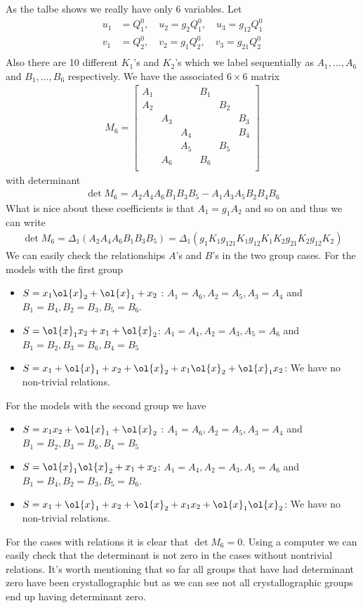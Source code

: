As the talbe shows we really have only 6 variables. Let
\begin{align}
	u_1 &= Q_1^0,\quad u_2 = g_2 Q_1^0,\quad u_3 = g_{12}Q_1^0\\
	v_1 &= Q_2^0,\quad v_2 = g_1 Q_2^0,\quad v_3 = g_{21}Q_2^0\\
\end{align}
Also there are 10 different $K_1$'s and $K_2$'s which we label sequentially as $A_1,\ldots,A_6$ and $B_1,\ldots,B_6$ respectively. We have the associated $ 6 \times 6$ matrix
\begin{align}
	M_6 = \begin{bmatrix}
	A_1& & & B_1 & & \\
	A_2& & & & B_2& \\
	& A_3& & & & B_3\\
	& & A_4 & & & B_4\\
	& & A_5& & B_5& \\
	&A_6 & &B_6 & & \\
	\end{bmatrix}
\end{align}
with determinant
\begin{align}
	\det M_6 = A_2A_4A_6 B_1 B_3 B_5 - A_1 A_3 A_5 B_2 B_4 B_6
\end{align}
What is nice about these coefficients is that $A_1 = g_1 A_2$ and so on and thus we can write
\begin{align}
	\det M_6 = \Delta_1 (A_2A_4A_6 B_1 B_3 B_5) = \Delta_1(g_1K_1 g_{121}K_1g_{12}K_1 K_2 g_{21}K_2 g_{12}K_2)
\end{align}
We can easily check the relationships $A$'s and $B$'s in the two group cases. For the models with the first group
\begin{itemize}
\item $S = x_1\ol{x}_2+\ol{x}_1+x_2$ : $A_1 = A_6, A_2 = A_5, A_3 = A_4$ and $B_1 = B_4, B_2 = B_3, B_5 = B_6$.
\item $S = \ol{x}_1x_2 + x_1 + \ol{x}_2$:  $A_1 = A_4, A_2 = A_3, A_5 = A_6$ and $B_1 = B_2, B_3 = B_6, B_4 = B_5$
\item $S = x_1+\ol{x}_1+x_2+\ol{x}_2+ x_1\ol{x}_2 + \ol{x}_1 x_2$: We have no non-trivial relations.
\end{itemize}
For the models with the second group we have
\begin{itemize}
\item $S = x_1 x_2+\ol{x}_1+\ol{x}_2$ :  $A_1 = A_6, A_2 = A_5, A_3 = A_4$ and $B_1 = B_2, B_3 = B_6, B_4 = B_5$
\item $S = \ol{x}_1\ol{x}_2 + x_1 + x_2$: $A_1 = A_4, A_2 = A_3, A_5 = A_6$ and $B_1 = B_4, B_2 = B_3, B_5 = B_6$.
\item $S = x_1+\ol{x}_1+x_2+\ol{x}_2+ x_1x_2 + \ol{x}_1\ol{x}_2$: We have no non-trivial relations.
\end{itemize}
For the cases with relations it is clear that $\det M_6 = 0$. Using a computer we can easily check that the determinant is not zero in the cases without nontrivial relations. It's worth mentioning that so far all groups that have had determinant zero have been crystallographic but as we can see not all crystallographic groups end up having determinant zero. 

